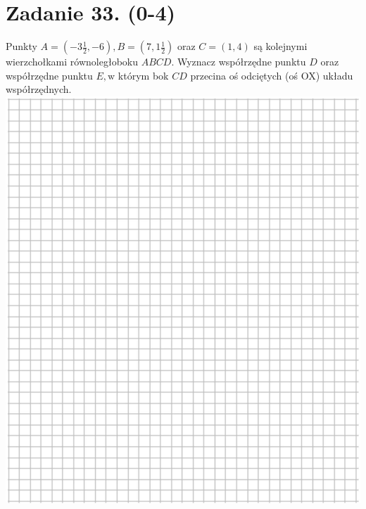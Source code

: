 \documentclass[10pt]{article}
\begin{document}
\section*{Zadanie 33. (0-4)}
Punkty \(A=\left(-3 \frac{1}{2},-6\right), B=\left(7,1 \frac{1}{2}\right)\) oraz \(C=(1,4)\) są kolejnymi wierzchołkami równoległoboku \(A B C D\). Wyznacz współrzędne punktu \(D\) oraz współrzędne punktu \(E, \mathrm{w}\) którym bok \(C D\) przecina oś odciętych (oś OX) układu współrzędnych.\\
\includegraphics[max width=\textwidth, center]{2024_11_21_ba65d61981011633d840g-17}\\
\(\qquad\)
\end{document}
